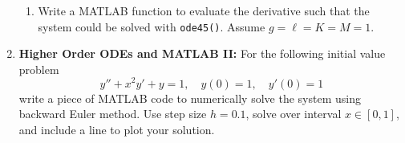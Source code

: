 \documentclass[letterpaper, fontsize=12pt]{scrartcl} %
\numberwithin{equation}{section} %
\numberwithin{figure}{section} %
\numberwithin{table}{section} %
\begin{document}
\begin{enumerate}
\begin{enumerate}[label=(\alph*)]


\item Write a MATLAB function to evaluate the derivative such that the system could be solved with \texttt{ode45()}. Assume $g = \ell = K = M = 1$.  
%
%

\end{enumerate}


\item \textbf{Higher Order ODEs and MATLAB II:}
For the following initial value problem
\[ y'' + x^2y' + y = 1,\quad y(0) = 1, \quad y'(0) = 1 \]
write a piece of MATLAB code to numerically solve the system using backward Euler method. Use step size $h = 0.1$, solve over interval $x \in [0,1]$, and include a line to plot your solution. 


\end{enumerate}
\end{document}

